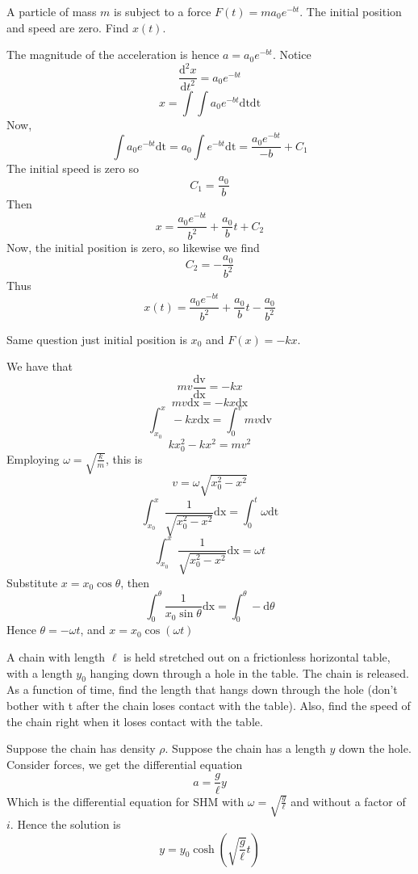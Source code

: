 \documentclass[11pt]{scrartcl}
\newcommand{\ca}[1]{\mathrm{#1}}
\begin{document}
\begin{example}
  [3.9]
  A particle of mass $m$ is subject to a force $F(t)=ma_0e^{-bt}$.
  The initial position and speed are zero. Find $x(t)$.
\end{example}
\begin{soln}
  The magnitude of the acceleration is hence $a=a_0e^{-bt}$.
  Notice
  $$\frac{\mathrm{d}^2x}{\mathrm{d}t^2}=a_0e^{-bt}$$
  $$x=\int \int a_0e^{-bt}\ca{dt}\ca{dt}$$
  Now,
  $$\int a_0e^{-bt}\ca{dt}=a_0\int e^{-bt}\ca{dt}=\frac{a_0e^{-bt}}{-b}+C_1$$
  The initial speed is zero so
  $$C_1=\frac{a_0}{b}$$
  Then
  $$x=\frac{a_0e^{-bt}}{b^2}+\frac{a_0}{b}t+C_2$$
  Now, the initial position is zero, so likewise we find
  $$C_2=-\frac{a_0}{b^2}$$
  Thus
  $$x(t)=\frac{a_0e^{-bt}}{b^2}+\frac{a_0}{b}t-\frac{a_0}{b^2}$$
\end{soln}
\begin{example}
  [3.10]
  Same question just initial position is $x_0$ and $F(x)=-kx$.
\end{example}
\begin{soln}
  We have that
  $$mv\frac{\ca{dv}}{\ca{dx}}=-kx$$
  $$mv\ca{dx}=-kx\ca{dx}$$
  $$\int_{x_0}^x -kx\ca{dx}=\int_0^v mv\ca{dv}$$
  $$kx_0^2-kx^2=mv^2$$
  Employing $\omega=\sqrt{\frac{k}{m}}$, this is
  $$v=\omega\sqrt{x_0^2-x^2}$$
  $$\int_{x_0}^x\frac{1}{\sqrt{x_0^2-x^2}}\ca{dx}=\int_0^t \omega\ca{dt}$$
  $$\int_{x_0}^x \frac{1}{\sqrt{x_0^2-x^2}}\ca{dx}=\omega t$$
  Substitute $x=x_0\cos\theta$, then
  $$\int_{0}^{\theta} \frac{1}{x_0\sin\theta}\ca{dx}=\int_{0}^{\theta} -\ca{d}\theta$$
  Hence $\theta=-\omega t$, and $x=x_0\cos(\omega t)$
\end{soln}
\begin{example}
  [3.11]
  A chain with length $\ell$ is held stretched out on a frictionless horizontal
  table, with a length $y_0$ hanging down through a hole in the table. The
  chain is released. As a function of time, find the length that hangs down
  through the hole (don’t bother with t after the chain loses contact with
  the table). Also, find the speed of the chain right when it loses contact
  with the table.
\end{example}
\begin{soln}
  Suppose the chain has density $\rho$. Suppose the chain
  has a length $y$ down the hole. Consider forces, we get the differential equation
  $$a=\frac{g}{\ell}y$$
  Which is the differential equation for SHM with $\omega=\sqrt{\frac{g}{\ell}}$ and
  without a factor of $i$. Hence the solution is
  $$y=y_0\cosh\left(\sqrt{\frac{g}{\ell}}t\right)$$
\end{soln}
\end{document}

